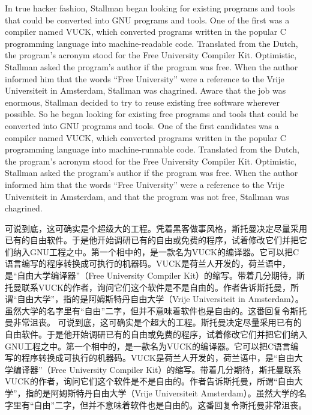 \ifdefined\eng
\ifdefined\vone
In true hacker fashion, Stallman began looking for existing programs and tools that could be converted into GNU programs and tools. One of the first was a compiler named VUCK, which converted programs written in the popular C programming language into machine-readable code. Translated from the Dutch, the program's acronym stood for the Free University Compiler Kit. Optimistic, Stallman asked the program's author if the program was free. When the author informed him that the words ``Free University'' were a reference to the Vrije Universiteit in Amsterdam, Stallman was chagrined.
\fi
\ifdefined\vtwo
Aware that the job was enormous, Stallman decided to try to reuse existing free software wherever possible.  So he began looking for existing free programs and tools that could be converted into GNU programs and tools. One of the first candidates was a compiler named VUCK, which converted programs written in the popular C programming language into machine-runnable code. Translated from the Dutch, the program's acronym stood for the Free University Compiler Kit. Optimistic, Stallman asked the program's author if the program was free. When the author informed him that the words ``Free University'' were a reference to the Vrije Universiteit in Amsterdam, and that the program was not free, Stallman was chagrined.
\fi
\fi

\ifdefined\chs
\ifdefined\vone
可说到底，这可确实是个超级大的工程。凭着黑客做事风格，斯托曼决定尽量采用已有的自由软件。于是他开始调研已有的自由或免费的程序，试着修改它们并把它们纳入GNU工程之中。第一个相中的，是一款名为VUCK的编译器。它可以把C语言编写的程序转换成可执行的机器码。VUCK是荷兰人开发的，荷兰语中，是``自由大学编译器''（Free University Compiler Kit）的缩写。带着几分期待，斯托曼联系VUCK的作者，询问它们这个软件是不是自由的。作者告诉斯托曼，所谓``自由大学''，指的是阿姆斯特丹自由大学（Vrije Universiteit in Amsterdam）。虽然大学的名字里有``自由''二字，但并不意味着软件也是自由的。这番回复令斯托曼非常沮丧。
\fi
\ifdefined\vtwo
可说到底，这可确实是个超大的工程。斯托曼决定尽量采用已有的自由软件。于是他开始调研已有的自由或免费的程序，试着修改它们并把它们纳入GNU工程之中。第一个相中的，是一款名为VUCK的编译器。它可以把C语言编写的程序转换成可执行的机器码。VUCK是荷兰人开发的，荷兰语中，是``自由大学编译器''（Free University Compiler Kit）的缩写。带着几分期待，斯托曼联系VUCK的作者，询问它们这个软件是不是自由的。作者告诉斯托曼，所谓``自由大学''，指的是阿姆斯特丹自由大学（Vrije Universiteit Amsterdam）。虽然大学的名字里有``自由''二字，但并不意味着软件也是自由的。这番回复令斯托曼非常沮丧。
\fi
\fi

